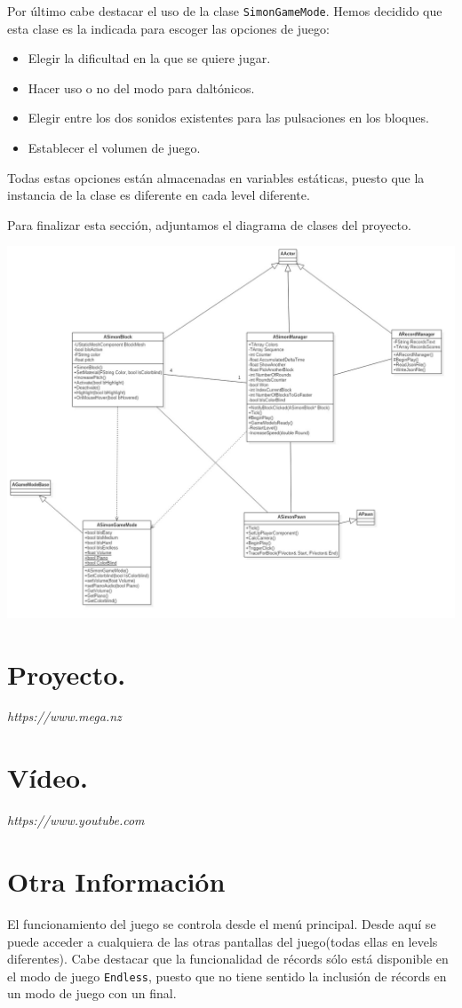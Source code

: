\documentclass{article}
\begin{document}
\vspace*{0.15in}

Por último cabe destacar el uso de la clase \texttt{SimonGameMode}. Hemos decidido que esta clase es la indicada para escoger las opciones de juego:

\begin{itemize}
\item Elegir la dificultad en la que se quiere jugar.
\item Hacer uso o no del modo para daltónicos.
\item Elegir entre los dos sonidos existentes para las pulsaciones en los bloques.
\item Establecer el volumen de juego.
\end{itemize}

Todas estas opciones están almacenadas en variables estáticas, puesto que la instancia de la clase es diferente en cada level diferente.

Para finalizar esta sección, adjuntamos el diagrama de clases del proyecto.

\includegraphics[width=15cm]{./images/ClassDiagram.jpg}
\section{Proyecto.}

\textsl{https://www.mega.nz}

\section{Vídeo.}

\textsl{https://www.youtube.com}

\section{Otra Información}
El funcionamiento del juego se controla desde el menú principal. Desde aquí se puede acceder a cualquiera de las otras pantallas del juego(todas ellas en levels diferentes). Cabe destacar que la funcionalidad de récords sólo está disponible en el modo de juego  \texttt{Endless}, puesto que no tiene sentido la inclusión de récords en un modo de juego con un final.
\end{document}
